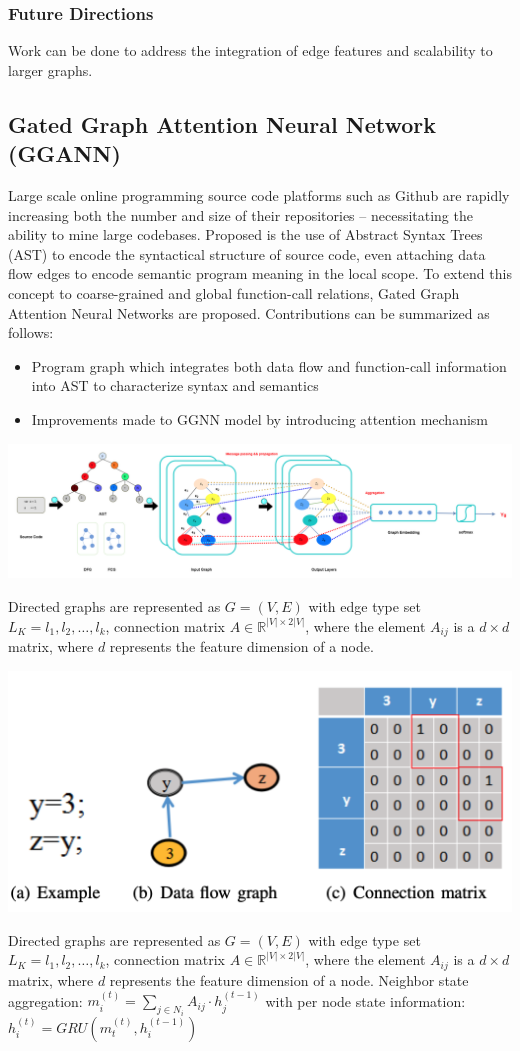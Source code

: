 \documentclass{article}
\begin{document}
\subsubsection{Future Directions}
Work can be done to address the integration of edge features and scalability to larger graphs.

\subsection{Gated Graph Attention Neural Network (GGANN)}
Large scale online programming source code platforms such as Github are rapidly increasing both the number and size of their repositories – necessitating the ability to mine large codebases.
Proposed is the use of Abstract Syntax Trees (AST) to encode the syntactical structure of source code, even attaching data flow edges to encode semantic program meaning in the local scope.
To extend this concept to coarse-grained and global function-call relations, Gated Graph Attention Neural Networks \cite{lu2019program} are proposed. Contributions can be summarized as follows:
\begin{itemize}
    \item Program graph which integrates both data flow and function-call information into AST to characterize syntax and semantics
    \item Improvements made to GGNN model by introducing attention mechanism
\end{itemize}
\centerline{\includegraphics[width=\columnwidth]{Images/Similarity2-4.png}}
Directed graphs are represented as $G = (V,E)$ with edge type set $L_K = {l_1, l_2, \dots, l_k}$, connection matrix $A \in \mathbb{R}^{|V| \times 2|V|}$, where the element $A_{ij}$ is a $d \times d$ matrix, where $d$ represents the feature dimension of a node.
\centerline{\includegraphics[width=\columnwidth]{Images/Similarity2-3.png}}
Directed graphs are represented as $G = (V,E)$ with edge type set $L_K = {l_1, l_2, \dots, l_k}$, connection matrix $A \in \mathbb{R}^{|V| \times 2|V|}$, where the element $A_{ij}$ is a $d \times d$ matrix, where $d$ represents the feature dimension of a node.
Neighbor state aggregation: $m_i^{(t)} = \sum\limits_{j \in N_i} A_{ij} \cdot h_j^{(t-1)}$ with per node state information: $h_i^{(t)} = GRU(m_t^{(t)}, h_i^{(t-1)})$
\end{document}
